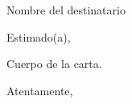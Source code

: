 \documentclass[letterpaper,12pt]{letter}
\begin{document}
\begin{letter}{Nombre del destinatario}
\opening{Estimado(a),}

Cuerpo de la carta.

\closing{Atentamente,}
\end{letter}
\end{document}

